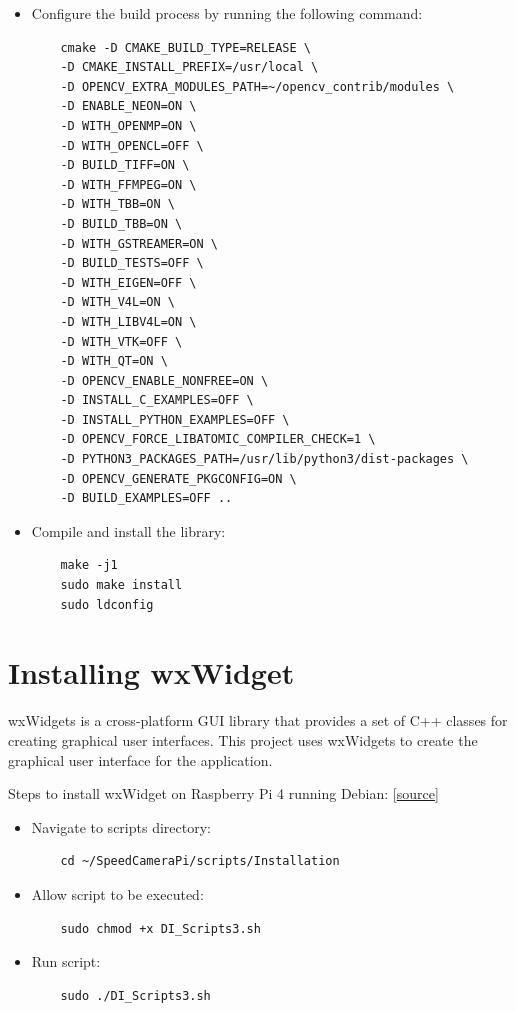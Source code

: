 \begin{itemize}
      \item Configure the build process by running the following command:

            \begin{lstlisting}
    cmake -D CMAKE_BUILD_TYPE=RELEASE \
    -D CMAKE_INSTALL_PREFIX=/usr/local \
    -D OPENCV_EXTRA_MODULES_PATH=~/opencv_contrib/modules \
    -D ENABLE_NEON=ON \
    -D WITH_OPENMP=ON \
    -D WITH_OPENCL=OFF \
    -D BUILD_TIFF=ON \
    -D WITH_FFMPEG=ON \
    -D WITH_TBB=ON \
    -D BUILD_TBB=ON \
    -D WITH_GSTREAMER=ON \
    -D BUILD_TESTS=OFF \
    -D WITH_EIGEN=OFF \
    -D WITH_V4L=ON \
    -D WITH_LIBV4L=ON \
    -D WITH_VTK=OFF \
    -D WITH_QT=ON \
    -D OPENCV_ENABLE_NONFREE=ON \
    -D INSTALL_C_EXAMPLES=OFF \
    -D INSTALL_PYTHON_EXAMPLES=OFF \
    -D OPENCV_FORCE_LIBATOMIC_COMPILER_CHECK=1 \
    -D PYTHON3_PACKAGES_PATH=/usr/lib/python3/dist-packages \
    -D OPENCV_GENERATE_PKGCONFIG=ON \
    -D BUILD_EXAMPLES=OFF ..
    \end{lstlisting}

      \item Compile and install the library:

            \begin{lstlisting}
    make -j1
    sudo make install
    sudo ldconfig
\end{lstlisting}
\end{itemize}

\section{Installing wxWidget}

wxWidgets is a cross-platform GUI library that provides a set of C++ classes for
creating graphical user interfaces. This project uses wxWidgets to create the
graphical user interface for the application.

Steps to install wxWidget on Raspberry Pi 4 running Debian:
[\href{https://forums.raspberrypi.com/viewtopic.php?t=271709}{source}]

\begin{itemize}
      \item Navigate to scripts directory:

            \begin{lstlisting}
    cd ~/SpeedCameraPi/scripts/Installation
    \end{lstlisting}

      \item Allow script to be executed:

            \begin{lstlisting}
    sudo chmod +x DI_Scripts3.sh
    \end{lstlisting}

      \item Run script:

            \begin{lstlisting}
    sudo ./DI_Scripts3.sh
    \end{lstlisting}
\end{itemize}

